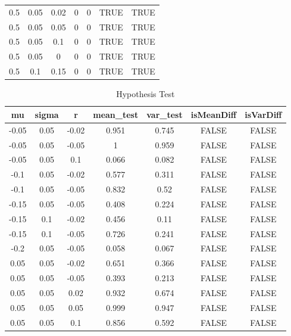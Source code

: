 \documentclass[
10pt, %
a4paper, %
oneside, %
headinclude,footinclude, %
BCOR5mm, %
]{scrartcl}
\begin{document}
\begin{table}[H]
\begin{tabular}{|c|c|c|c|c|c|c|}
		0.5   & 0.05  & 0.02  & 0          & 0         & TRUE       & TRUE      \\
		0.5   & 0.05  & 0.05  & 0          & 0         & TRUE       & TRUE      \\
		0.5   & 0.05  & 0.1   & 0          & 0         & TRUE       & TRUE      \\
		0.5   & 0.05  & 0     & 0          & 0         & TRUE       & TRUE      \\
		0.5   & 0.1   & 0.15  & 0          & 0         & TRUE       & TRUE   \\ 
		\hline 
	\end{tabular}
\end{table}
\newpage

\begin{table}[H]
	\centering
	\caption{Hypothesis Test}
	\label{my-label}
	\begin{tabular}{|c|c|c|c|c|c|c|}
		\hline
		mu    & sigma & r     & mean\_test & var\_test & isMeanDiff & isVarDiff \\
		\hline
		-0.05 & 0.05  & -0.02 & 0.951      & 0.745     & FALSE      & FALSE     \\
		-0.05 & 0.05  & -0.05 & 1          & 0.959     & FALSE      & FALSE     \\
		-0.05 & 0.05  & 0.1   & 0.066      & 0.082     & FALSE      & FALSE     \\
		-0.1  & 0.05  & -0.02 & 0.577      & 0.311     & FALSE      & FALSE     \\
		-0.1  & 0.05  & -0.05 & 0.832      & 0.52      & FALSE      & FALSE     \\
		-0.15 & 0.05  & -0.05 & 0.408      & 0.224     & FALSE      & FALSE     \\
		-0.15 & 0.1   & -0.02 & 0.456      & 0.11      & FALSE      & FALSE     \\
		-0.15 & 0.1   & -0.05 & 0.726      & 0.241     & FALSE      & FALSE     \\
		-0.2  & 0.05  & -0.05 & 0.058      & 0.067     & FALSE      & FALSE     \\
		0.05  & 0.05  & -0.02 & 0.651      & 0.366     & FALSE      & FALSE     \\
		0.05  & 0.05  & -0.05 & 0.393      & 0.213     & FALSE      & FALSE     \\
		0.05  & 0.05  & 0.02  & 0.932      & 0.674     & FALSE      & FALSE     \\
		0.05  & 0.05  & 0.05  & 0.999      & 0.947     & FALSE      & FALSE     \\
		0.05  & 0.05  & 0.1   & 0.856      & 0.592     & FALSE      & FALSE     \\

\end{tabular}
\end{table}
\end{document}
